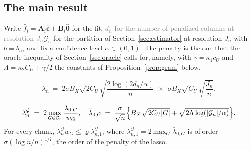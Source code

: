 \documentclass[12pt]{article} %
\theoremstyle{definition}
\theoremstyle{plain}
\newcommand{\btheta}{\boldsymbol{\theta}}
\newcommand{\thetahat}{\widehat{\btheta}}
\newcommand{\chat}{\widehat{\mathbf{c}}}
\newcommand{\penn}{\lambda_{n}}
\newcommand{\Amat}{\mathbf{A}}
\newcommand{\Bmat}{\mathbf{B}}
\newcommand{\Gcal}{\mathcal{G}}
\newcommand{\bn}{b_{n}}
\newcommand{\lamG}{\lambda^{\mathcal{G}}_{n}}
\newcommand{\lamGone}{\lambda^{\mathcal{G}}_{n,1}}
\newcommand{\lamzbar}[1]{\bar{\lambda}_{0,#1}}
\newcommand{\removedk}{\par\noindent[removed in k = 4]\par}
\begin{document}
\subsection{The main result}
\label{sec:main}

Write $\widehat{f}_i = \Amat_i\chat + \Bmat_i\thetahat$ for the fit, \textcolor{gray}{\sout{$d_n$ for
the number of penalized columns at resolution $J_n$}}\textcolor{colR1}{$\Gcal_{n}$ for the
partition of Section~\ref{sec:estimator} at resolution $J_n$ with $b = \bn$},
and fix a confidence
level $\alpha \in (0,1)$. The penalty is the one that the oracle inequality of
Section~\ref{sec:oracle} calls for, namely\textcolor{colR1}{, with $\gamma = \kappa_1c_U$
and $\Lambda = \kappa_2C_U + \gamma/2$ the constants of
Proposition~\ref{prop:gram} below,}
{\color{gray}\removedk
\[
  \penn \;=\; 2\sigma B_X\sqrt{2C_U}\,
  \sqrt{\frac{2\log(2d_n/\alpha)}{n}} \;\asymp\;
  \sigma B_X \sqrt{C_U}\,\sqrt{\frac{J_n}{n}} .
\]
}
{\color{colR1}
\begin{equation}
  \label{eq:lambda}
  \lamG \;=\; 2\max_{G\in\Gcal_{n}}\frac{\lamzbar{G}}{w_{G}},
  \quad
  \lamzbar{G} \;=\; \frac{\sigma}{\sqrt{n}}\Bigl\{B_X\sqrt{2C_U|G|}
  + \sqrt{2\Lambda\log(|\Gcal_{n}|/\alpha)}\Bigr\} .
\end{equation}
For every chunk, $\lamG w_{G} \le \varrho\lamGone$, where
$\lamGone = 2\max_{G}\lamzbar{G}$ is of order $\sigma(\log n/n)^{1/2}$, the
order of the penalty of the lasso.}
\end{document}
